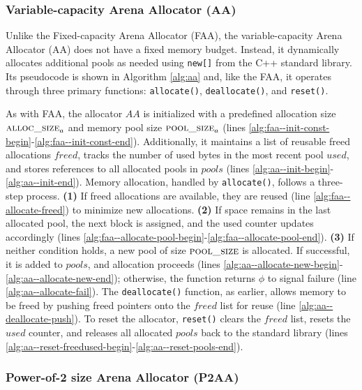 \subsubsection{Variable-capacity Arena Allocator (AA)}
\label{sec:aa}

Unlike the Fixed-capacity Arena Allocator (FAA), the variable-capacity Arena Allocator (AA) does not have a fixed memory budget. Instead, it dynamically allocates additional pools as needed using \texttt{new[]} from the C++ standard library. Its pseudocode is shown in Algorithm \ref{alg:aa} and, like the FAA, it operates through three primary functions: \texttt{allocate()}, \texttt{deallocate()}, and \texttt{reset()}.



As with FAA, the allocator $AA$ is initialized with a predefined allocation size $\textsc{alloc\_size}_a$ and memory pool size $\textsc{pool\_size}_a$ (lines \ref{alg:faa--init-const-begin}-\ref{alg:faa--init-const-end}). Additionally, it maintains a list of reusable freed allocations $freed$, tracks the number of used bytes in the most recent pool $used$, and stores references to all allocated pools in $pools$ (lines \ref{alg:aa--init-begin}-\ref{alg:aa--init-end}). Memory allocation, handled by \texttt{allocate()}, follows a three-step process. \textbf{(1)} If freed allocations are available, they are reused (line \ref{alg:faa--allocate-freed}) to minimize new allocations. \textbf{(2)} If space remains in the last allocated pool, the next block is assigned, and the used counter updates accordingly (lines \ref{alg:faa--allocate-pool-begin}-\ref{alg:faa--allocate-pool-end}). \textbf{(3)} If neither condition holds, a new pool of size $\textsc{pool\_size}$ is allocated. If successful, it is added to $pools$, and allocation proceeds (lines \ref{alg:aa--allocate-new-begin}-\ref{alg:aa--allocate-new-end}); otherwise, the function returns $\phi$ to signal failure (line \ref{alg:aa--allocate-fail}). The \texttt{deallocate()} function, as earlier, allows memory to be freed by pushing freed pointers onto the $freed$ list for reuse (line \ref{alg:aa--deallocate-push}). To reset the allocator, \texttt{reset()} clears the $freed$ list, resets the $used$ counter, and releases all allocated $pools$ back to the standard library (lines \ref{alg:aa--reset-freedused-begin}-\ref{alg:aa--reset-pools-end}).


\subsubsection{Power-of-2 size Arena Allocator (P2AA)}
\label{sec:p2aa}

